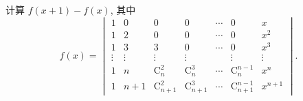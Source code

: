 \begin{example}[2008 山西师范大学]
    计算 $f(x+1)-f(x)$, 其中
    $$f(x)=\begin{vmatrix}
            1      & 0      & 0                  & 0                  & \cdots & 0                      & x       \\
            1      & 2      & 0                  & 0                  & \cdots & 0                      & x^2     \\
            1      & 3      & 3                  & 0                  & \cdots & 0                      & x^3     \\
            \vdots & \vdots & \vdots             & \vdots             &        & \vdots                 & \vdots  \\
            1      & n      & \mathrm{C}_n^2     & \mathrm{C}_n^3     & \cdots & \mathrm{C}_n^{n-1}     & x^n     \\
            1      & n+1    & \mathrm{C}_{n+1}^2 & \mathrm{C}_{n+1}^3 & \cdots & \mathrm{C}_{n+1}^{n-1} & x^{n+1}
        \end{vmatrix}.$$
\end{example}
